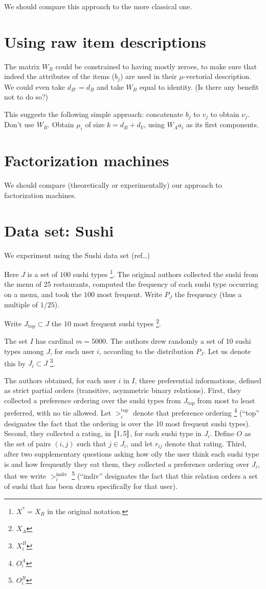 \documentclass[version=last, pagesize, twoside=off, bibliography=totoc, DIV=calc, fontsize=14pt, a4paper, french, english]{scrartcl}
\begin{document}
We should compare this approach to the more classical one.

\section{Using raw item descriptions}
The matrix $W_B$ could be constrained to having mostly zeroes, to make sure that indeed the attributes of the items ($b_j$) are used in their $\mu$-vectorial description. We could even take $d_{B'} = d_B$ and take $W_B$ equal to identity. (Is there any benefit not to do so?)

This suggests the following simple approach: concatenate $b_j$ to $v_j$ to obtain $\nu_j$. Don’t use $W_B$. Obtain $\mu_i$ of size $k = d_B + d_V$, using $W_A a_i$ as its first components.

\section{Factorization machines}
We should compare (theoretically or experimentally) our approach to factorization machines.

\section{Data set: Sushi}
We experiment using the Sushi data set (ref…)

Here $J$ is a set of $100$ sushi types \footnote{$X^*=X_B$ in the original notation.}. The original authors collected the sushi from the menu of 25 restaurants, computed the frequency of each sushi type occurring on a menu, and took the $100$ most frequent. Write $P_J$ the frequency (thus a multiple of $1/25$).

Write $J_\text{top} \subset J$ the $10$ most frequent sushi types \footnote{$X_A$}.

The set $I$ has cardinal $m = 5000$. The authors drew randomly a set of 10 sushi types among $J$, for each user $i$, according to the distribution $P_J$. Let us denote this by $J_i \subset J$ \footnote{$X^B_i$}.

The authors obtained, for each user $i$ in $I$, three preferential informations, defined as strict partial orders (transitive, asymmetric binary relations). First, they collected a preference ordering over the sushi types from $J_\text{top}$ from most to least preferred, with no tie allowed. Let $>^\text{top}_i$ denote that preference ordering \footnote{$O^A_i$} (“top” designates the fact that the ordering is over the 10 most frequent sushi types). Second, they collected a rating, in $\lbrack\!\lbrack{}1, 5\rbrack\!\rbrack$, for each sushi type in $J_i$. Define $O$ as the set of pairs $(i, j)$ such that $j \in J_i$, and let $r_{ij}$ denote that rating. Third, after two supplementary questions asking how oily the user think each sushi type is and how frequently they eat them, they collected a preference ordering over $J_i$, that we write $>^\text{indiv}_i$ \footnote{$O^B_i$} (“indiv” designates the fact that this relation orders a set of sushi that has been drawn specifically for that user).
\end{document}
